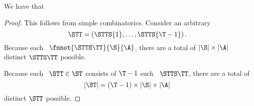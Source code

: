 \begin{proposition}
  We have that %
\end{proposition}

\begin{proof}
  This follows from simple combinatorics.
  Consider an arbitrary \str
  $$\STT = \left(\STTS{1},\ldots,\STTS{\T - 1}\right).$$
  Because each \stpstr\ $\fnnot{\STTS\TT}{\S}{\A}$,
  there are a total of $|\S| \times |\A|$ distinct $\STTS\TT$ possible.

  Because each \str\ $\STT \in \ST$ consists of $\T - 1$ such \stpstrs\ $\STTS\TT$,
  there are a total of 
  $$|\ST| = (\T - 1) \times |\S| \times |\A|$$
  distinct $\STT$ possible.
\end{proof}
